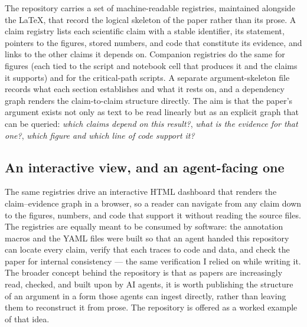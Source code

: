 The repository carries a set of machine-readable registries, maintained alongside
the LaTeX, that record the logical skeleton of the paper rather than its prose. A
claim registry lists each scientific claim with a stable identifier, its statement,
pointers to the figures, stored numbers, and code that constitute its evidence, and
links to the other claims it depends on. Companion registries do the same for
figures (each tied to the script and notebook cell that produces it and the claims
it supports) and for the critical-path scripts. A separate argument-skeleton file
records what each section establishes and what it rests on, and a dependency graph
renders the claim-to-claim structure directly. The aim is that the paper's argument
exists not only as text to be read linearly but as an explicit graph that can be
queried: \emph{which claims depend on this result?}, \emph{what is the evidence for
that one?}, \emph{which figure and which line of code support it?}

\subsection{An interactive view, and an agent-facing one}
\label{app:dashboard}

The same registries drive an interactive HTML dashboard that renders the
claim--evidence graph in a browser, so a reader can navigate from any claim down to
the figures, numbers, and code that support it without reading the source files.
The registries are equally meant to be consumed by software: the annotation macros
and the YAML files were built so that an agent handed this repository can locate
every claim, verify that each traces to code and data, and check the paper for
internal consistency --- the same verification I relied on while writing it. The
broader concept behind the repository is that as papers are increasingly read,
checked, and built upon by AI agents, it is worth publishing the structure of an
argument in a form those agents can ingest directly, rather than leaving them to
reconstruct it from prose. The repository is offered as a worked example of that
idea.
